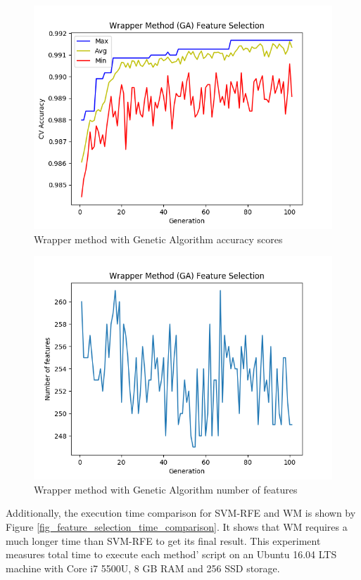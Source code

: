 \documentclass[conference]{IEEEtran}
\begin{document}
\begin{figure}
	\includegraphics[scale=0.5]{../images/WM_GA_SVM_acc_chart.png}
	\caption{Wrapper method with Genetic Algorithm accuracy scores}
	\label{fig_wm_acc_chart}
\end{figure}

\begin{figure}
	\includegraphics[scale=0.5]{../images/WM_GA_SVM_feat_chart.png}
	\caption{Wrapper method with Genetic Algorithm number of features}
	\label{fig_wm_num_features_chart}
\end{figure}

Additionally, the execution time comparison for SVM-RFE and WM is shown by Figure \ref{fig_feature_selection_time_comparison}. It shows that WM requires a much longer time than SVM-RFE to get its final result. This experiment measures total time to execute each method' script on an Ubuntu 16.04 LTS machine with Core i7 5500U, 8 GB RAM and 256 SSD storage.
\end{document}
